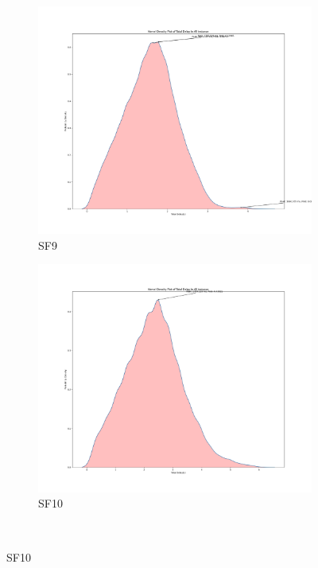 \begin{figure}[htp!]
    \\
    \begin{subfigure}{0.45\linewidth}
        \includegraphics[width=\linewidth]{images/Total Delay density3.png}
        \caption{SF9}
    \end{subfigure}
   \hfill
    \begin{subfigure}{0.45\linewidth}
        \includegraphics[width=\linewidth]{images/Total Delay density4.png}
        \caption{SF10}
    \end{subfigure}
    \\

\end{figure}
